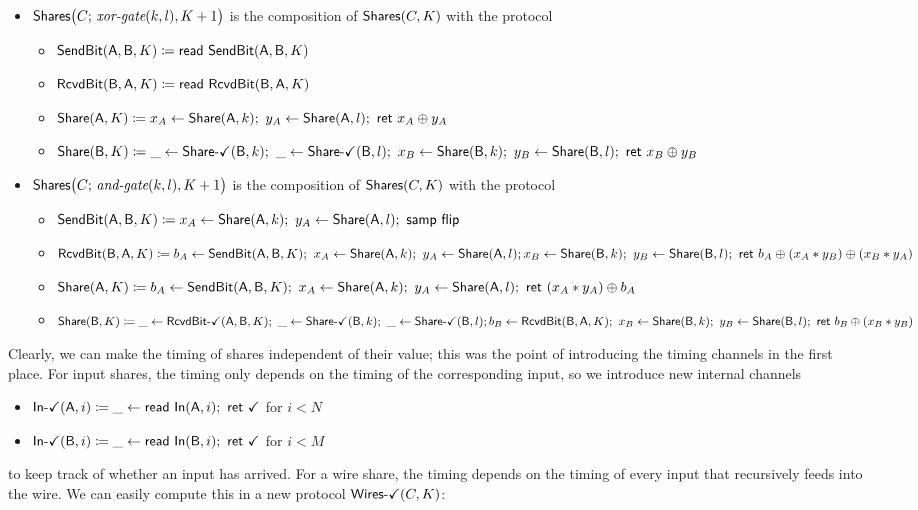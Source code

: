 \begin{itemize}
\item $\mathsf{Shares}\big(C; \, \textit{xor-gate}(k,l),K+1\big)$ is the composition of $\mathsf{Shares}(C,K)$ with the protocol
\begin{itemize}
\item $\mathsf{SendBit}(\mathsf{A},\mathsf{B},K) \coloneqq \mathsf{read} \ \mathsf{SendBit}(\mathsf{A},\mathsf{B},K)$
\item $\mathsf{RcvdBit}(\mathsf{B},\mathsf{A},K) \coloneqq \mathsf{read} \ \mathsf{RcvdBit}(\mathsf{B},\mathsf{A},K)$
\item $\mathsf{Share}(\mathsf{A},K) \coloneqq x_A \leftarrow \mathsf{Share}(\mathsf{A},k); \ y_A \leftarrow \mathsf{Share}(\mathsf{A},l); \ \mathsf{ret} \ x_A \oplus y_A$
\item $\mathsf{Share}(\mathsf{B},K) \coloneqq \_ \leftarrow \mathsf{Share}\textsf{-}\checkmark(\mathsf{B},k); \ \_ \leftarrow \mathsf{Share}\textsf{-}\checkmark(\mathsf{B},l); \ x_B \leftarrow \mathsf{Share}(\mathsf{B},k); \ y_B \leftarrow \mathsf{Share}(\mathsf{B},l); \ \mathsf{ret} \ x_B \oplus y_B$
\end{itemize}

\item $\mathsf{Shares}\big(C; \, \textit{and-gate}(k,l),K+1\big)$ is the composition of $\mathsf{Shares}(C,K)$ with the protocol
\begin{itemize}
\item $\SendBit(\A,\B,K) \coloneqq x_A \leftarrow \Share(\A,k); \ y_A \leftarrow \Share(\A,l); \ \samp{\flip}$
\item $\mathsf{RcvdBit}(\mathsf{B},\mathsf{A},K) \coloneqq b_A \leftarrow \mathsf{SendBit}(\mathsf{A},\mathsf{B},K); \ x_A \leftarrow \mathsf{Share}(\mathsf{A},k); \ y_A \leftarrow \mathsf{Share}(\mathsf{A},l); \\ x_B \leftarrow \mathsf{Share}(\mathsf{B},k); \ y_B \leftarrow \mathsf{Share}(\mathsf{B},l); \ \mathsf{ret} \ b_A \oplus (x_A * y_B) \oplus (x_B * y_A)$
\item $\mathsf{Share}(\mathsf{A},K) \coloneqq b_A \leftarrow \mathsf{SendBit}(\mathsf{A},\mathsf{B},K); \ x_A \leftarrow \mathsf{Share}(\mathsf{A},k); \ y_A \leftarrow \mathsf{Share}(\mathsf{A},l); \ \mathsf{ret} \ (x_A * y_A) \oplus b_A$
\item $\mathsf{Share}(\mathsf{B},K) \coloneqq \_ \leftarrow \mathsf{RcvdBit}\textsf{-}\checkmark(\mathsf{A},\mathsf{B},K); \ \_ \leftarrow \mathsf{Share}\textsf{-}\checkmark(\mathsf{B},k); \ \_ \leftarrow \mathsf{Share}\textsf{-}\checkmark(\mathsf{B},l); \\ b_B \leftarrow \mathsf{RcvdBit}(\mathsf{B},\mathsf{A},K); \ x_B \leftarrow \mathsf{Share}(\mathsf{B},k); \ y_B \leftarrow \mathsf{Share}(\mathsf{B},l); \ \mathsf{ret} \ b_B \oplus (x_B * y_B)$
\end{itemize}
\end{itemize}

\noindent Clearly, we can make the timing of shares independent of their value; this was the point of introducing the timing channels in the first place. For input shares, the timing only depends on the timing of the corresponding input, so we introduce new internal channels
\begin{itemize}
\item {\color{teal} $\mathsf{In}\textsf{-}\checkmark(\mathsf{A},i) \coloneqq \_ \leftarrow \mathsf{read} \ \mathsf{In}(\mathsf{A},i); \ \mathsf{ret} \ \checkmark$ for $i < N$}
\item {\color{teal} $\mathsf{In}\textsf{-}\checkmark(\mathsf{B},i) \coloneqq \_ \leftarrow \mathsf{read} \ \mathsf{In}(\mathsf{B},i); \ \mathsf{ret} \ \checkmark$ for $i < M$}
\end{itemize}
to keep track of whether an input has arrived. For a wire share, the timing depends on the timing of every input that recursively feeds into the wire. We can easily compute this in a new protocol $\mathsf{Wires}\textsf{-}\checkmark(C,K)$:

